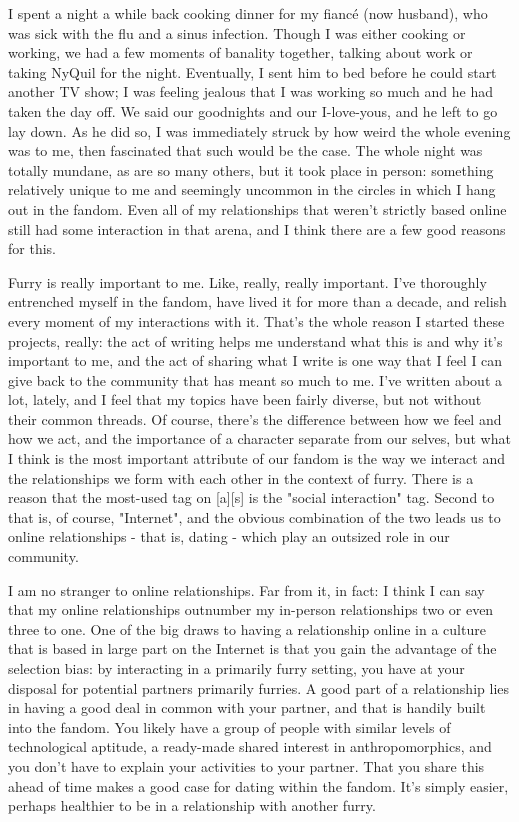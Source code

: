 
I spent a night a while back cooking dinner for my fiancé (now husband), who was sick with the flu and a sinus infection. Though I was either cooking or working, we had a few moments of banality together, talking about work or taking NyQuil for the night. Eventually, I sent him to bed before he could start another TV show; I was feeling jealous that I was working so much and he had taken the day off. We said our goodnights and our I-love-yous, and he left to go lay down. As he did so, I was immediately struck by how weird the whole evening was to me, then fascinated that such would be the case. The whole night was totally mundane, as are so many others, but it took place in person: something relatively unique to me and seemingly uncommon in the circles in which I hang out in the fandom. Even all of my relationships that weren't strictly based online still had some interaction in that arena, and I think there are a few good reasons for this.

Furry is really important to me. Like, really, really important. I've thoroughly entrenched myself in the fandom, have lived it for more than a decade, and relish every moment of my interactions with it. That's the whole reason I started these projects, really: the act of writing helps me understand what this is and why it's important to me, and the act of sharing what I write is one way that I feel I can give back to the community that has meant so much to me. I've written about a lot, lately, and I feel that my topics have been fairly diverse, but not without their common threads. Of course, there's the difference between how we feel and how we act, and the importance of a character separate from our selves, but what I think is the most important attribute of our fandom is the way we interact and the relationships we form with each other in the context of furry. There is a reason that the most-used tag on {[}a{]}{[}s{]} is the "social interaction" tag. Second to that is, of course, "Internet", and the obvious combination of the two leads us to online relationships - that is, dating - which play an outsized role in our community.

I am no stranger to online relationships. Far from it, in fact: I think I can say that my online relationships outnumber my in-person relationships two or even three to one. One of the big draws to having a relationship online in a culture that is based in large part on the Internet is that you gain the advantage of the selection bias: by interacting in a primarily furry setting, you have at your disposal for potential partners primarily furries. A good part of a relationship lies in having a good deal in common with your partner, and that is handily built into the fandom. You likely have a group of people with similar levels of technological aptitude, a ready-made shared interest in anthropomorphics, and you don't have to explain your activities to your partner. That you share this ahead of time makes a good case for dating within the fandom. It's simply easier, perhaps healthier to be in a relationship with another furry.

